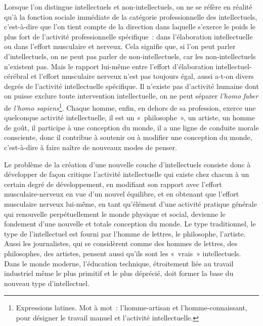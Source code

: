 \documentclass[french,twoside]{book} %
\begin{document}
Lorsque l’on distingue intellectuels et non-intellectuels, on ne se réfère en réalité qu’à la fonction sociale immédiate de la catégorie professionnelle des intellectuels, c’est-à-dire que l’on tient compte de la direction dans laquelle s’exerce le poids le plus fort de l’activité professionnelle spécifique : dans l’élaboration intellectuelle ou dans l’effort musculaire et nerveux. Cela signifie que, si l’on peut parler d’intellectuels, on ne peut pas parler de non-intellectuels, car les non-intellectuels n’existent pas. Mais le rapport lui-même entre l’effort d’élaboration intellectuel-cérébral et l’effort musculaire nerveux n’est pas toujours égal, aussi a-t-on divers degrés de l’activité intellectuelle spécifique. Il n’existe pas d’activité humaine dont on puisse exclure toute intervention intellectuelle, on ne peut séparer \emph{l’homo faber} de \emph{l’homo sapiens}\footnote{Expressions latines. Mot à mot : l’homme-artisan et l’homme-connaissant, pour désigner le travail manuel et l’activité intellectuelle.}. Chaque homme, enfin, en dehors de sa profession, exerce une quelconque activité intellectuelle, il est un « philosophe », un artiste, un homme de goût, il participe à une conception du monde, il a une ligne de conduite morale consciente, donc il contribue à soutenir ou à modifier une conception du monde, c’est-à-dire à faire naître de nouveaux modes de penser.\par
Le problème de la création d’une nouvelle couche d’intellectuels consiste donc à développer de façon critique l’activité intellectuelle qui existe chez chacun à un certain degré de développement, en modifiant son rapport avec l’effort musculaire-nerveux en vue d’un nouvel équilibre, et en obtenant que l’effort musculaire nerveux lui-même, en tant qu’élément d’une activité pratique générale qui renouvelle perpétuellement le monde physique et social, devienne le fondement d’une nouvelle et totale conception du monde. Le type traditionnel, le type de l’intellectuel est fourni par l’homme de lettres, le philosophe, l’artiste. Aussi les journalistes, qui se considèrent comme des hommes de lettres, des philosophes, des artistes, pensent aussi qu’ils sont les « vrais » intellectuels. Dans le monde moderne, l’éducation technique, étroitement liée au travail industriel même le plus primitif et le plus déprécié, doit former la base du nouveau type d’intellectuel.\par
\end{document}
